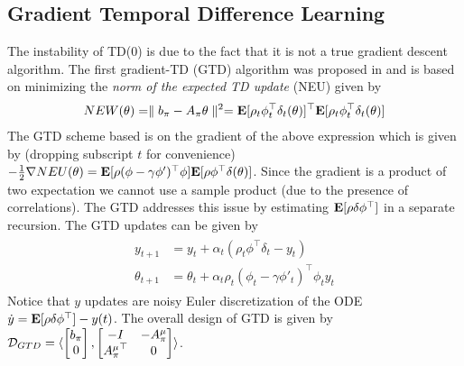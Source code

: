 \subsection{Gradient Temporal Difference Learning}
The instability of TD($0$) is due to the fact that it is not a true gradient descent algorithm. The first gradient-TD (GTD) algorithm was proposed in \cite{} and is based on minimizing the \emph{norm of the expected TD update} (NEU) given by
\begin{align}\label{neu}
NEW(\theta)=\parallel b_\pi -A_\pi\theta\parallel^2
=\mathbf{E}[\rho_t\phi_t^\top\delta_t(\theta)]^\top\mathbf{E}[\rho_t\phi_t^\top\delta_t(\theta)]
\end{align}
The GTD scheme based is on the gradient of the above expression which is given by (dropping subscript $t$ for convenience) $-\frac{1}{2}\nabla NEU(\theta)=\mathbf{E}[\rho (\phi-\gamma\phi')^\top \phi]\mathbf{E}[\rho \phi^\top\delta(\theta)]$. Since the gradient is a product of two expectation we cannot use a sample product (due to the presence of correlations). The GTD addresses this issue by estimating $\mathbf{E}[\rho\delta\phi^\top]$ in a separate recursion. The GTD updates can be given by
\begin{align}
\begin{split}
y_{t+1}&=y_t+\alpha_t(\rho_t\phi^\top\delta_t -y_t)\\
\theta_{t+1}&=\theta_t+\alpha_t\rho_t(\phi_t-\gamma\phi'_t)^\top\phi_ty_t
\end{split}
\end{align}
Notice that $y$ updates are noisy Euler discretization of the ODE $\dot{y}=\mathbf{E}[\rho\delta\phi^\top]-y(t)$. The overall design of GTD is given by $\mathcal{D}_{GTD}=\langle \begin{bmatrix}b_\pi\\ 0\\ \end{bmatrix},\begin{bmatrix}-I &-A^\mu_\pi \\ {A^\mu_\pi}^\top &0 \\ \end{bmatrix}\rangle$.\par
